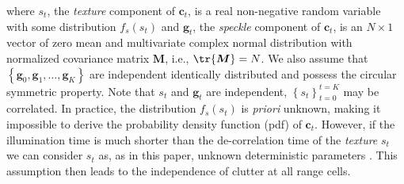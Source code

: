 where $s_t$, the
\textit{texture} component of $\boldsymbol{c}_t$,
is a real non-negative random variable with some 
distribution $f_s(s_t)$ and
$\boldsymbol{g}_t$, the
\textit{speckle} component of $\boldsymbol{c}_t$,
is an $N \times 1$ vector of zero mean and multivariate complex normal distribution
with normalized covariance matrix $\boldsymbol{M}$, i.e.,
$\tr{\boldsymbol{M}} = N$.
We also assume that $\left \{ \boldsymbol{g}_0,\boldsymbol{g}_1,\ldots,\boldsymbol{g}_K  \right \}$
 are independent identically distributed
 and possess the circular symmetric property.
Note that $s_t$ and $\boldsymbol{g}_t$ are independent, 
$\left \{ s_t\right\}_{t = 0}^{t = K}$
may be correlated.
In practice, the distribution $f_s(s_t)$ is \textit{priori} unknown,
making it impossible to derive the probability density function (pdf)
of $\boldsymbol{c}_t$.
However,
if the illumination time is much shorter than
the de-correlation time of the \textit{texture} $s_t$
we can consider $s_t$ as, as in this paper,
unknown deterministic parameters \cite{Conte_Aug02}.
 This assumption then leads to the independence of clutter
 at all range cells.

